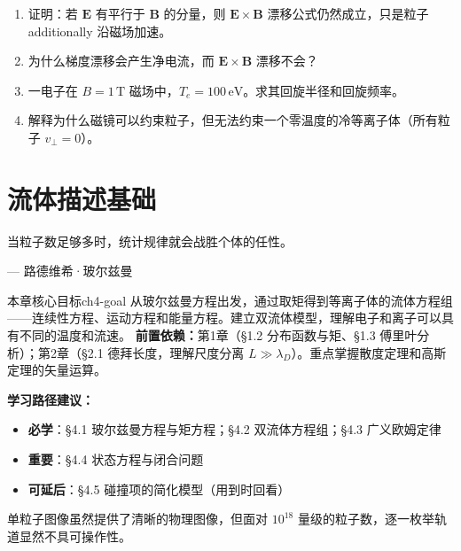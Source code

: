 \documentclass[12pt,a4paper,openany,oneside]{book}
\newcommand{\vect}[1]{\bm{#1}}
\begin{document}
\begin{miniquiz}
\begin{enumerate}
\item 证明：若 $\vect{E}$ 有平行于 $\vect{B}$ 的分量，则 $\vect{E}\times\vect{B}$ 漂移公式仍然成立，只是粒子 additionally 沿磁场加速。
\item 为什么梯度漂移会产生净电流，而 $\vect{E}\times\vect{B}$ 漂移不会？
\item 一电子在 $B=1\,\mathrm{T}$ 磁场中，$T_e=100\,\mathrm{eV}$。求其回旋半径和回旋频率。
\item 解释为什么磁镜可以约束粒子，但无法约束一个零温度的冷等离子体（所有粒子 $v_\perp=0$）。
\end{enumerate}
\end{miniquiz}





\chapter{流体描述基础}\label{ch:4}
\epigraph{当粒子数足够多时，统计规律就会战胜个体的任性。}{--- 路德维希·玻尔兹曼}

\begin{insight}{本章核心目标}{ch4-goal}
从玻尔兹曼方程出发，通过取矩得到等离子体的流体方程组——连续性方程、运动方程和能量方程。建立双流体模型，理解电子和离子可以具有不同的温度和流速。
\tcblower
\textbf{前置依赖：}第1章（\S1.2 分布函数与矩、\S1.3 傅里叶分析）；第2章（\S2.1 德拜长度，理解尺度分离 $L\gg\lambda_D$）。重点掌握散度定理和高斯定理的矢量运算。

\textbf{学习路径建议：}

\begin{itemize}[leftmargin=*]
\item[\textcolor{red}{$\blacksquare$}] \textbf{必学}：\S4.1 玻尔兹曼方程与矩方程；\S4.2 双流体方程组；\S4.3 广义欧姆定律
\item[\textcolor{orange}{$\blacksquare$}] \textbf{重要}：\S4.4 状态方程与闭合问题
\item[\textcolor{green}{$\blacksquare$}] \textbf{可延后}：\S4.5 碰撞项的简化模型（用到时回看）
\end{itemize}
\end{insight}

单粒子图像虽然提供了清晰的物理图像，但面对 $10^{18}$ 量级的粒子数，逐一枚举轨道显然不具可操作性。
\end{document}
